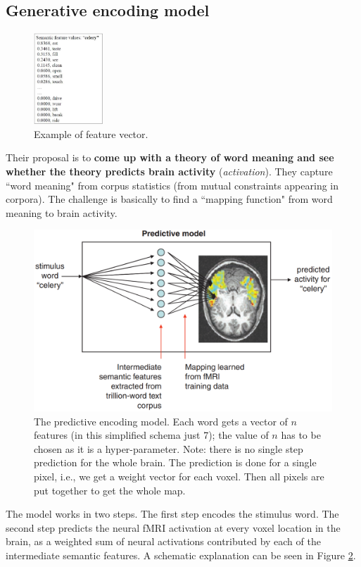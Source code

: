\subsection{Generative encoding model}
\begin{figure}
  \centering
  \includegraphics[width=0.23\textwidth]{images/mitchell_2.png}
  \caption{Example of feature vector.}
  \label{fig:mitchell_2}
\end{figure}
Their proposal is to \textbf{come up with a theory of word meaning and see whether the theory predicts brain activity} (\textit{activation}). They capture ``word meaning" from corpus statistics (from mutual constraints appearing in corpora). The challenge is basically to find a ``mapping function" from word meaning to brain activity.
\begin{figure}
    \centering
    \captionsetup{width=.8\linewidth}
    \includegraphics[width=0.55\linewidth]{images/mitchell.png}
    \caption{The predictive encoding model. Each word gets a vector of $n$ features (in this simplified schema just 7); the value of $n$ has to be chosen as it is a hyper-parameter. Note: there is no single step prediction for the whole brain. The prediction is done for a single pixel, i.e., we get a weight vector for each voxel. Then all pixels are put together to get the whole map.}
    \label{fig:mitchell}
\end{figure}

The model works in two steps. The first step encodes the stimulus word.
The second step predicts the neural fMRI activation at every voxel location in the brain, as a weighted sum of neural activations contributed by each of the intermediate semantic features. A schematic explanation can be seen in Figure \ref{fig:mitchell}.

